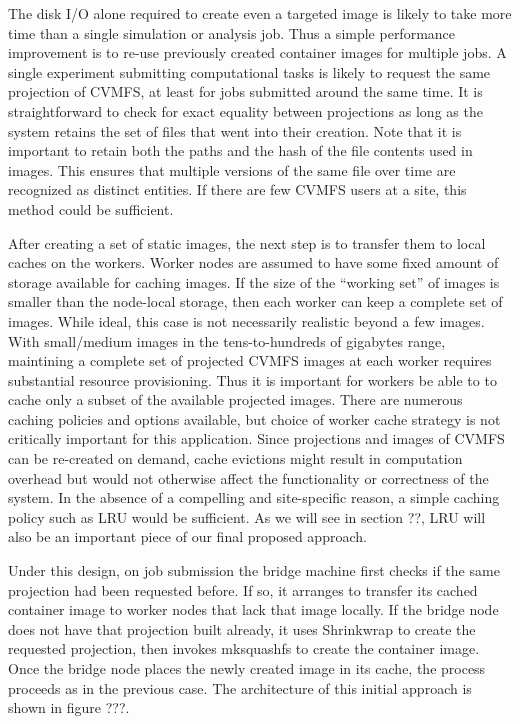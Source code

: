 \documentclass[conference]{IEEEtran}
\begin{document}
The disk I/O alone required to create even a targeted image is likely to take more time than a single simulation or analysis job.
Thus a simple performance improvement is to re-use previously created container images for multiple jobs.
A single experiment submitting computational tasks is likely to request the same projection of CVMFS,
at least for jobs submitted around the same time.
It is straightforward to check for exact equality between projections as long as the system retains the set of files that went into their creation.
Note that it is important to retain both the paths and the hash of the file contents used in images.
This ensures that multiple versions of the same file over time are recognized as distinct entities.
If there are few CVMFS users at a site,
this method could be sufficient.

After creating a set of static images,
the next step is to transfer them to local caches on the workers.
Worker nodes are assumed to have some fixed amount of storage available for caching images.
If the size of the ``working set'' of images is smaller than the node-local storage,
then each worker can keep a complete set of images.
While ideal, this case is not necessarily realistic beyond a few images.
With small/medium images in the tens-to-hundreds of gigabytes range,
maintining a complete set of projected CVMFS images at each worker requires substantial resource provisioning.
Thus it is important for workers be able to to cache only a subset of the available projected images.
There are numerous caching policies and options available,
but choice of worker cache strategy is not critically important for this application.
Since projections and images of CVMFS can be re-created on demand,
cache evictions might result in computation overhead but would not otherwise affect the functionality or correctness of the system.
In the absence of a compelling and site-specific reason,
a simple caching policy such as LRU would be sufficient.
As we will see in section ??,
LRU will also be an important piece of our final proposed approach.

Under this design,
on job submission the bridge machine first checks if the same projection had been requested before.
If so, it arranges to transfer its cached container image to worker nodes that lack that image locally.
If the bridge node does not have that projection built already,
it uses Shrinkwrap to create the requested projection,
then invokes mksquashfs to create the container image.
Once the bridge node places the newly created image in its cache,
the process proceeds as in the previous case.
The architecture of this initial approach is shown in figure ???.
\end{document}
